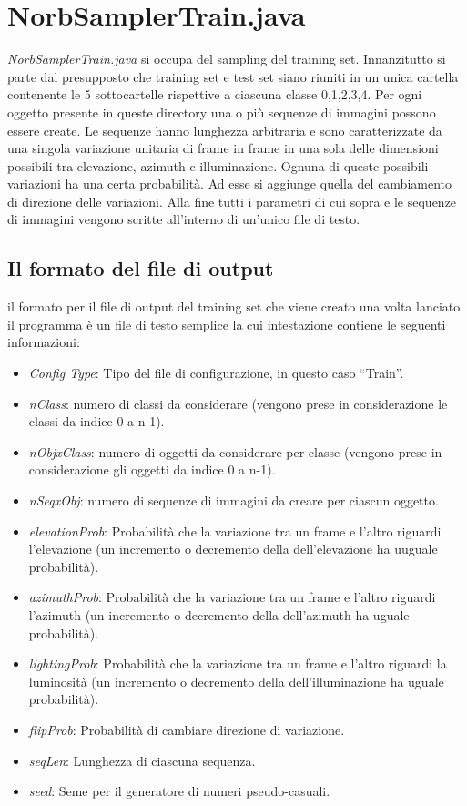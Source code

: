\documentclass[paper=a4, fontsize=11pt]{scrartcl} %
\numberwithin{equation}{section} %
\numberwithin{figure}{section} %
\numberwithin{table}{section} %
\begin{document}
\section{NorbSamplerTrain.java}
\emph{NorbSamplerTrain.java} si occupa del sampling del training set.
Innanzitutto si parte dal presupposto che training set e test set siano riuniti in un unica cartella contenente le 5 sottocartelle rispettive a ciascuna classe 0,1,2,3,4.
Per ogni oggetto presente in queste directory una o più sequenze di immagini possono essere create. Le sequenze hanno lunghezza arbitraria e sono caratterizzate da una singola variazione unitaria di frame in frame in una sola delle dimensioni possibili tra elevazione, azimuth e illuminazione. Ognuna di queste possibili variazioni ha una certa probabilità. Ad esse si aggiunge quella del cambiamento di direzione delle variazioni. Alla fine tutti i parametri di cui sopra e le sequenze di immagini vengono scritte all'interno di un'unico file di testo.

\subsection{Il formato del file di output}
il formato per il file di output del training set che viene creato una volta lanciato il programma è un file di testo semplice la cui intestazione contiene le seguenti informazioni:

\begin{itemize}
\item \emph{Config Type}: Tipo del file di configurazione, in questo caso ``Train''.
\item \emph{nClass}: numero di classi da considerare (vengono prese in considerazione le classi da indice 0 a n-1).
\item \emph{nObjxClass}: numero di oggetti da considerare per classe (vengono prese in considerazione gli oggetti da indice 0 a n-1).
\item \emph{nSeqxObj}: numero di sequenze di immagini da creare per ciascun oggetto.
\item \emph{elevationProb}: Probabilità che la variazione tra un frame e l'altro riguardi l'elevazione (un incremento o decremento della dell'elevazione ha uuguale probabilità).
\item \emph{azimuthProb}: Probabilità che la variazione tra un frame e l'altro riguardi l'azimuth (un incremento o decremento della dell'azimuth ha uguale probabilità).
\item \emph{lightingProb}: Probabilità che la variazione tra un frame e l'altro riguardi la luminosità (un incremento o decremento della dell'illuminazione ha uguale probabilità).
\item \emph{flipProb}: Probabilità di cambiare direzione di variazione.
\item \emph{seqLen}: Lunghezza di ciascuna sequenza.
\item \emph{seed}: Seme per il generatore di numeri pseudo-casuali.
\end{itemize}
\end{document}
